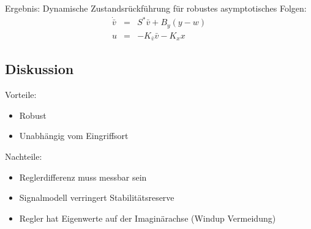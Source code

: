 Ergebnis: Dynamische Zustandsrückführung für robustes asymptotisches Folgen:
\begin{eqnarray}
    \dot{\bar{v}} &=& S^* \bar{v} + B_y (y-w) \\
    u &=& -K_{\bar{v}} \bar{v} - K_x x
\end{eqnarray}

\subsection{Diskussion}
Vorteile:
\begin{itemize}
    \item Robust
    \item Unabhängig vom Eingriffsort
\end{itemize}

Nachteile:
\begin{itemize}
    \item Reglerdifferenz muss messbar sein
    \item Signalmodell verringert Stabilitätsreserve
    \item Regler hat Eigenwerte auf der Imaginärachse (Windup Vermeidung)
\end{itemize}
